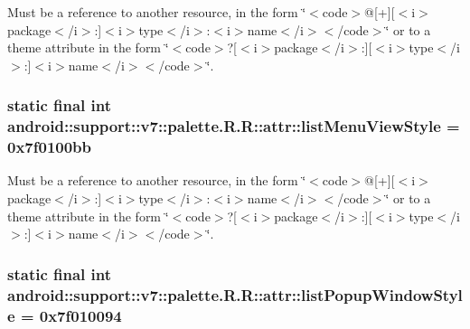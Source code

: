 Must be a reference to another resource, in the form \char`\"{}$<$code$>$@\mbox{[}+\mbox{]}\mbox{[}$<$i$>$package$<$/i$>$:\mbox{]}$<$i$>$type$<$/i$>$:$<$i$>$name$<$/i$>$$<$/code$>$\char`\"{} or to a theme attribute in the form \char`\"{}$<$code$>$?\mbox{[}$<$i$>$package$<$/i$>$:\mbox{]}\mbox{[}$<$i$>$type$<$/i$>$:\mbox{]}$<$i$>$name$<$/i$>$$<$/code$>$\char`\"{}. \hypertarget{classandroid_1_1support_1_1v7_1_1palette_1_1_r_1_1attr_5a8c580ca2cce0ce17a1c5df9c6ba662}{
\subsubsection[{listMenuViewStyle}]{\setlength{\rightskip}{0pt plus 5cm}static final int android::support::v7::palette.R.R::attr::listMenuViewStyle = 0x7f0100bb}}
\label{classandroid_1_1support_1_1v7_1_1palette_1_1_r_1_1attr_5a8c580ca2cce0ce17a1c5df9c6ba662}


Must be a reference to another resource, in the form \char`\"{}$<$code$>$@\mbox{[}+\mbox{]}\mbox{[}$<$i$>$package$<$/i$>$:\mbox{]}$<$i$>$type$<$/i$>$:$<$i$>$name$<$/i$>$$<$/code$>$\char`\"{} or to a theme attribute in the form \char`\"{}$<$code$>$?\mbox{[}$<$i$>$package$<$/i$>$:\mbox{]}\mbox{[}$<$i$>$type$<$/i$>$:\mbox{]}$<$i$>$name$<$/i$>$$<$/code$>$\char`\"{}. \hypertarget{classandroid_1_1support_1_1v7_1_1palette_1_1_r_1_1attr_b2daa9a4f5ca36b05faeda2be2c66641}{
\subsubsection[{listPopupWindowStyle}]{\setlength{\rightskip}{0pt plus 5cm}static final int android::support::v7::palette.R.R::attr::listPopupWindowStyle = 0x7f010094}}
\label{classandroid_1_1support_1_1v7_1_1palette_1_1_r_1_1attr_b2daa9a4f5ca36b05faeda2be2c66641}


